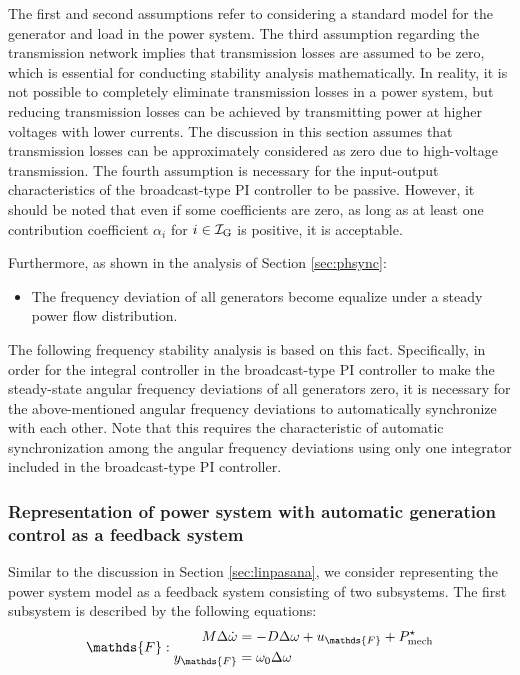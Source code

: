 \documentclass[graybox, envcountchap]{svmult}
\begin{document}
The first and second assumptions refer to considering a standard model for the
generator and load in the power system. The third assumption regarding the
transmission network implies that transmission losses are assumed to be zero,
which is essential for conducting stability analysis mathematically. In reality,
it is not possible to completely eliminate transmission losses in a power
system, but reducing transmission losses can be achieved by transmitting power
at higher voltages with lower currents. The discussion in this section assumes
that transmission losses can be approximately considered as zero due to
high-voltage transmission. The fourth assumption is necessary for the
input-output characteristics of the broadcast-type PI controller to be passive.
However, it should be noted that even if some coefficients are zero, as long as
at least one contribution coefficient $\alpha_i$ for $i\in \mathcal{I}_{\rm G}$
is positive, it is acceptable. 

Furthermore, as shown in the analysis of Section \ref{sec:phsync}:

\begin{itemize}
  \item The frequency deviation of all generators become equalize under a steady power flow distribution.
\end{itemize}

The following frequency stability analysis is based on this fact. Specifically,
in order for the integral controller in the broadcast-type PI controller to make
the steady-state angular frequency deviations of all generators zero, it is
necessary for the above-mentioned angular frequency deviations to automatically
synchronize with each other. Note that this requires the characteristic of
automatic synchronization among the angular frequency deviations using only one
integrator included in the broadcast-type PI controller.

\smallskip
\subsubsection{Representation of power system with automatic generation control
as a feedback system}

Similar to the discussion in Section \ref{sec:linpasana}, we consider
representing the power system model as a feedback system consisting of two
subsystems. The first subsystem is described by the following equations:
\begin{equation}\label{eq:sys1}
  \mathds{F}:
  \begin{aligned}
    M \Delta \dot{\omega}&= 
    - 
    D
    \Delta\omega 
    + 
    u_{\mathds{F}}
    +P_{{\rm mech}}^{\star}
    \\
    y_{\mathds{F}}&= \omega_0 \Delta\omega 
  \end{aligned}
\end{equation}
\end{document}
